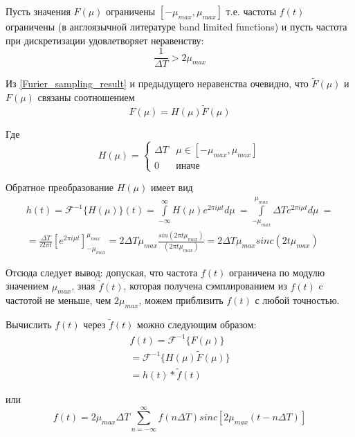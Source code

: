 \documentclass[oneside,final,14pt]{extreport}
\begin{document}
Пусть значения $F(\mu)$  ограничены $[-\mu_{max},\mu_{max} ] $ т.е. частоты $f(t)$ ограничены  (в англоязычной литературе band limited functions) и 
пусть частота при дискретизации удовлетворяет неравенству:
\begin{equation}
\frac{1}{\varDelta T} 
>
2\mu_{max}
\end{equation}

Из \ref{Furier_sampling_result} и предыдущего неравенства очевидно, что $\tilde{F}(\mu)$ и $F(\mu)$ связаны соотношением
\begin{equation}
F(\mu)
=
H(\mu)
\tilde{F}(\mu)
\end{equation}

Где 
\begin{equation}
H(\mu)
=
\begin{cases}
\varDelta T & 
\mu \in [-\mu_{max},\mu_{max}] \\
0 & иначе
\end{cases}
\end{equation}

Обратное преобразование $H(\mu)$ имеет вид
\begin{gather*}
h(t)
=
\mathcal{F}^{-1}\{H(\mu)\}(t)
=
\int\limits_{-\infty}^{\infty}
H(\mu)
e^{2\pi i \mu t }
d\mu~
=
\int\limits_{-\mu_{max}}^{\mu_{max}}
\varDelta T
e^{2\pi i \mu t }
d\mu~
=
\\
=
\frac{\varDelta T}
{i 2 \pi t} 
\left[
e^{	2\pi i \mu t }
\right]_{-\mu_{max}}^{\mu_{max}}
=
2\varDelta T \mu_{max}
\frac{sin(2\pi t \mu_{max}) }{(2\pi t \mu_{max})}
=
2\varDelta T \mu_{max}
sinc(2t\mu_{max})
\end{gather*}

Отсюда следует вывод:  допуская, что частота $f(t)$ ограничена по модулю значением $\mu_{max}$, зная $\tilde{f}(t)$, которая получена сэмплированием из $f(t)$ c частотой не меньше, чем $2 \mu_{max}$,  можем приблизить $f(t)$ с любой точностью. 

Вычислить $f(t)$ через $\tilde{f}(t)$ можно следующим образом:
\begin{gather*}
f(t)
=
\mathcal{F}^{-1}
\{ F(\mu) \}
\\
=
\mathcal{F}^{-1}
\{
H(\mu)\tilde{F}(\mu)
\}
\\
=
h(t)*\tilde{f}(t)
\end{gather*}

или 
\begin{equation}
f(t) 
=
2  \mu_{max} \varDelta T
\sum_{ n = - \infty}^{\infty}
f(n \varDelta T ) 
sinc[ 2  \mu_{max}  (t - n \varDelta T) 	]
\end{equation}
\end{document}
